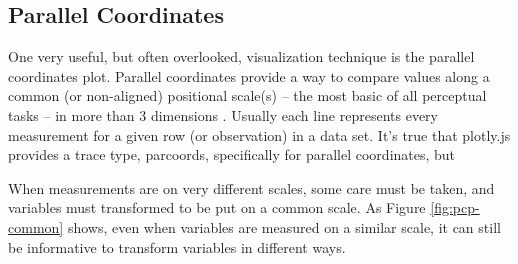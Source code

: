 \documentclass[
  12pt,
]{krantz}
\newenvironment{Shaded}{\begin{snugshade}}{\end{snugshade}}
\newcommand{\ControlFlowTok}[1]{\textcolor[rgb]{0.13,0.29,0.53}{\textbf{#1}}}
\newcommand{\DataTypeTok}[1]{\textcolor[rgb]{0.13,0.29,0.53}{#1}}
\newcommand{\DecValTok}[1]{\textcolor[rgb]{0.00,0.00,0.81}{#1}}
\newcommand{\FloatTok}[1]{\textcolor[rgb]{0.00,0.00,0.81}{#1}}
\newcommand{\KeywordTok}[1]{\textcolor[rgb]{0.13,0.29,0.53}{\textbf{#1}}}
\newcommand{\NormalTok}[1]{#1}
\newcommand{\OperatorTok}[1]{\textcolor[rgb]{0.81,0.36,0.00}{\textbf{#1}}}
\newcommand{\OtherTok}[1]{\textcolor[rgb]{0.56,0.35,0.01}{#1}}
\newcommand{\StringTok}[1]{\textcolor[rgb]{0.31,0.60,0.02}{#1}}
\begin{document}
\hypertarget{parallel-coordinates}{%
\subsection{Parallel Coordinates}\label{parallel-coordinates}}

One very useful, but often overlooked, visualization technique is the parallel coordinates plot. Parallel coordinates provide a way to compare values along a common (or non-aligned) positional scale(s) -- the most basic of all perceptual tasks -- in more than 3 dimensions \citep{graphical-perception}. Usually each line represents every measurement for a given row (or observation) in a data set. It's true that plotly.js provides a trace type, parcoords, specifically for parallel coordinates, but

When measurements are on very different scales, some care must be taken, and variables must transformed to be put on a common scale. As Figure \ref{fig:pcp-common} shows, even when variables are measured on a similar scale, it can still be informative to transform variables in different ways.

\begin{Shaded}
\end{Shaded}
\end{document}
